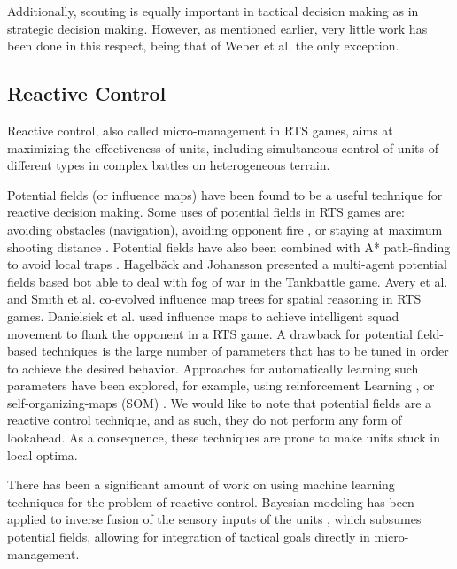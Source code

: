 \documentclass[journal]{IEEEtran}
\begin{document}
Additionally, scouting is equally important in tactical decision making as in strategic decision making. However, as mentioned earlier, very little work has been done in this respect, being that of Weber et al. \cite{WeberAIIDE11} the only exception.


\subsection{Reactive Control}

Reactive control, also called micro-management in RTS games, aims at maximizing the effectiveness of units, including simultaneous control of units of different types in complex battles on heterogeneous terrain. 

Potential fields (or influence maps) have been found to be a useful technique for reactive decision making. Some uses of potential fields in RTS games are: avoiding obstacles (navigation), avoiding opponent fire \cite{uriarte2012kiting}, or staying at maximum shooting distance \cite{Hagelback09}. Potential fields have also been combined with A* path-finding to avoid local traps \cite{Hagelback12}. Hagelb\"{a}ck and Johansson \cite{HagelbackJ08} presented a multi-agent potential fields based bot able to deal with fog of war in the Tankbattle game. Avery et al. \cite{Avery09} and Smith et al. \cite{SmithCIG10} co-evolved influence map trees for spatial reasoning in RTS games. Danielsiek et al. \cite{Danielsiek_2008} used influence maps to achieve intelligent squad movement to flank the opponent in a RTS game. A drawback for potential field-based techniques is the large number of parameters that has to be tuned in order to achieve the desired behavior. Approaches for automatically learning such parameters have been explored, for example, using reinforcement Learning \cite{Liu_2008}, or self-organizing-maps (SOM) \cite{teamCompositionRTS}. We would like to note that potential fields are a reactive control technique, and as such, they do not perform any form of lookahead. As a consequence, these techniques are prone to make units stuck in local optima. 


There has been a significant amount of work on using machine learning techniques for the problem of reactive control. Bayesian modeling has been applied to inverse fusion of the sensory inputs of the units \cite{SynnaeveMicroCig11}, which subsumes potential fields, allowing for integration of tactical goals directly in micro-management. 
\end{document}
